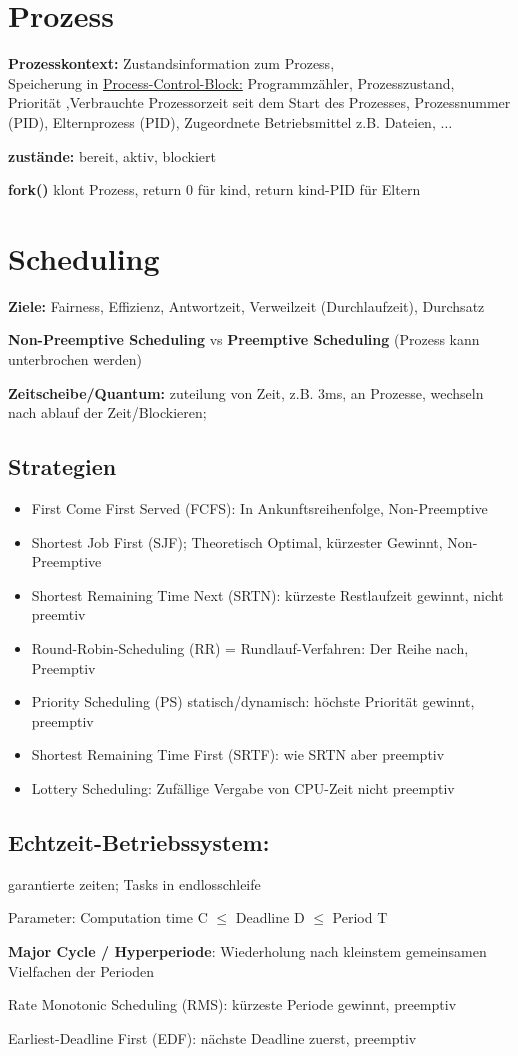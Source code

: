 \section*{Prozess}
\textbf{Prozesskontext:} Zustandsinformation zum Prozess, \\
Speicherung in \underline{Process-Control-Block:} Programmzähler, Prozesszustand, Priorität ,Verbrauchte Prozessorzeit seit dem Start des Prozesses, Prozessnummer (PID), Elternprozess (PID), Zugeordnete Betriebsmittel z.B. Dateien, $\dots$

\textbf{zustände:} bereit, aktiv, blockiert 

\textbf{fork()} klont Prozess, return 0 für kind, return kind-PID für Eltern

\section*{Scheduling}
\textbf{Ziele:} Fairness, Effizienz, Antwortzeit, Verweilzeit (Durchlaufzeit), Durchsatz

\textbf{Non-Preemptive Scheduling} vs \textbf{Preemptive Scheduling} (Prozess kann unterbrochen werden)



\textbf{Zeitscheibe/Quantum:} zuteilung von Zeit, z.B. 3ms, an Prozesse, wechseln nach ablauf der Zeit/Blockieren;


\subsection*{Strategien}
\begin{itemize}
\item First Come First Served (FCFS): In Ankunftsreihenfolge, Non-Preemptive
\item Shortest Job First (SJF); Theoretisch Optimal, kürzester Gewinnt, Non-Preemptive
\item Shortest Remaining Time Next (SRTN): kürzeste Restlaufzeit gewinnt, nicht preemtiv

\item Round-Robin-Scheduling (RR) = Rundlauf-Verfahren: Der Reihe nach, Preemptiv
\item Priority Scheduling (PS) statisch/dynamisch: höchste Priorität gewinnt, preemptiv
\item Shortest Remaining Time First (SRTF): wie SRTN aber preemptiv
\item Lottery Scheduling: Zufällige Vergabe von CPU-Zeit nicht preemptiv

\end{itemize}

\subsection*{Echtzeit-Betriebssystem:} 
garantierte zeiten; Tasks in endlosschleife

Parameter: Computation time C $\leq$ Deadline D $\leq$ Period T

\textbf{ Major Cycle / Hyperperiode}: Wiederholung nach kleinstem gemeinsamen Vielfachen der Perioden

Rate Monotonic Scheduling (RMS): kürzeste Periode gewinnt, preemptiv

Earliest-Deadline First (EDF): nächste Deadline zuerst, preemptiv